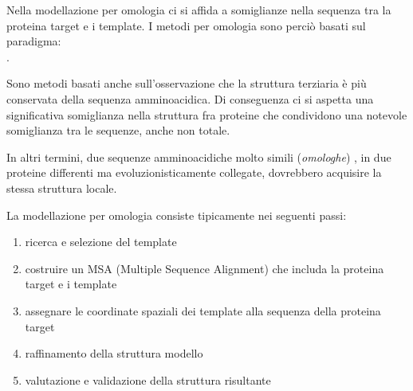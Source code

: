 {
Nella modellazione per omologia ci si affida a somiglianze nella sequenza tra la proteina target e i template. I metodi per omologia sono perciò basati sul paradigma: \\
 .

\par Sono metodi basati anche sull'osservazione che la struttura terziaria è più conservata della sequenza amminoacidica. Di conseguenza ci si aspetta una significativa somiglianza nella struttura fra proteine che condividono una notevole somiglianza tra le sequenze, anche non totale.

\par In altri termini, due sequenze amminoacidiche molto simili (\textit{omologhe}) , in due proteine differenti ma evoluzionisticamente collegate, dovrebbero acquisire la stessa struttura locale.

\par La modellazione per omologia consiste tipicamente nei seguenti passi:
\begin{enumerate}
	\item ricerca e selezione del template
	\item costruire un MSA (Multiple Sequence Alignment) che includa la proteina target e i template
	\item assegnare le coordinate spaziali dei template alla sequenza della proteina target
	\item raffinamento della struttura modello
	\item valutazione e validazione della struttura risultante
\end{enumerate}

}
